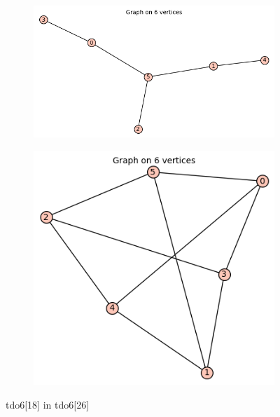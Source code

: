 \documentclass[12pt, a4paper]{article}
\begin{document}
\begin{center}
\begin{figure}[!htb]
\centering
\begin{subfigure}{0.5\textwidth}
  \centering
  \includegraphics[width=0.5\linewidth]{tdo6[18]}
\end{subfigure}%
\begin{subfigure}{0.5\textwidth}
  \centering
  \includegraphics[width=0.5\linewidth]{tdo6[26]}
\end{subfigure}
\caption{tdo6[18] in tdo6[26]}
\label{fig:test}
\end{figure}


\end{center}
\end{document}
